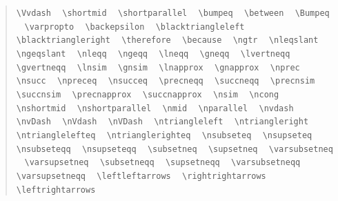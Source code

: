 \documentclass{article}
\newcommand{\texcommand}[1]{\textbackslash{}#1}
\newcommand{\spacer}{\,\,\, \hfil}
\newenvironment{mylist}{\begin{quote}}{\end{quote}}
\begin{document}
\begin{mylist}
\texttt{\texcommand{Vvdash}} \spacer 
\texttt{\texcommand{shortmid}} \spacer 
\texttt{\texcommand{shortparallel}} \spacer 
\texttt{\texcommand{bumpeq}} \spacer 
\texttt{\texcommand{between}} \spacer 
\texttt{\texcommand{Bumpeq}} \spacer 
\texttt{\texcommand{varpropto}} \spacer 
\texttt{\texcommand{backepsilon}} \spacer 
\texttt{\texcommand{blacktriangleleft}} \spacer 
\texttt{\texcommand{blacktriangleright}} \spacer 
\texttt{\texcommand{therefore}} \spacer 
\texttt{\texcommand{because}} \spacer 
\texttt{\texcommand{ngtr}} \spacer 
\texttt{\texcommand{nleqslant}} \spacer 
\texttt{\texcommand{ngeqslant}} \spacer 
\texttt{\texcommand{nleqq}} \spacer 
\texttt{\texcommand{ngeqq}} \spacer 
\texttt{\texcommand{lneqq}} \spacer 
\texttt{\texcommand{gneqq}} \spacer 
\texttt{\texcommand{lvertneqq}} \spacer 
\texttt{\texcommand{gvertneqq}} \spacer 
\texttt{\texcommand{lnsim}} \spacer 
\texttt{\texcommand{gnsim}} \spacer 
\texttt{\texcommand{lnapprox}} \spacer 
\texttt{\texcommand{gnapprox}} \spacer 
\texttt{\texcommand{nprec}} \spacer 
\texttt{\texcommand{nsucc}} \spacer 
\texttt{\texcommand{npreceq}} \spacer 
\texttt{\texcommand{nsucceq}} \spacer 
\texttt{\texcommand{precneqq}} \spacer 
\texttt{\texcommand{succneqq}} \spacer 
\texttt{\texcommand{precnsim}} \spacer 
\texttt{\texcommand{succnsim}} \spacer 
\texttt{\texcommand{precnapprox}} \spacer 
\texttt{\texcommand{succnapprox}} \spacer 
\texttt{\texcommand{nsim}} \spacer 
\texttt{\texcommand{ncong}} \spacer 
\texttt{\texcommand{nshortmid}} \spacer 
\texttt{\texcommand{nshortparallel}} \spacer 
\texttt{\texcommand{nmid}} \spacer 
\texttt{\texcommand{nparallel}} \spacer 
\texttt{\texcommand{nvdash}} \spacer 
\texttt{\texcommand{nvDash}} \spacer 
\texttt{\texcommand{nVdash}} \spacer 
\texttt{\texcommand{nVDash}} \spacer 
\texttt{\texcommand{ntriangleleft}} \spacer 
\texttt{\texcommand{ntriangleright}} \spacer 
\texttt{\texcommand{ntrianglelefteq}} \spacer 
\texttt{\texcommand{ntrianglerighteq}} \spacer 
\texttt{\texcommand{nsubseteq}} \spacer 
\texttt{\texcommand{nsupseteq}} \spacer 
\texttt{\texcommand{nsubseteqq}} \spacer 
\texttt{\texcommand{nsupseteqq}} \spacer 
\texttt{\texcommand{subsetneq}} \spacer 
\texttt{\texcommand{supsetneq}} \spacer 
\texttt{\texcommand{varsubsetneq}} \spacer 
\texttt{\texcommand{varsupsetneq}} \spacer 
\texttt{\texcommand{subsetneqq}} \spacer 
\texttt{\texcommand{supsetneqq}} \spacer 
\texttt{\texcommand{varsubsetneqq}} \spacer 
\texttt{\texcommand{varsupsetneqq}} \spacer 
\texttt{\texcommand{leftleftarrows}} \spacer 
\texttt{\texcommand{rightrightarrows}} \spacer 
\texttt{\texcommand{leftrightarrows}} \spacer 

\end{mylist}
\end{document}
